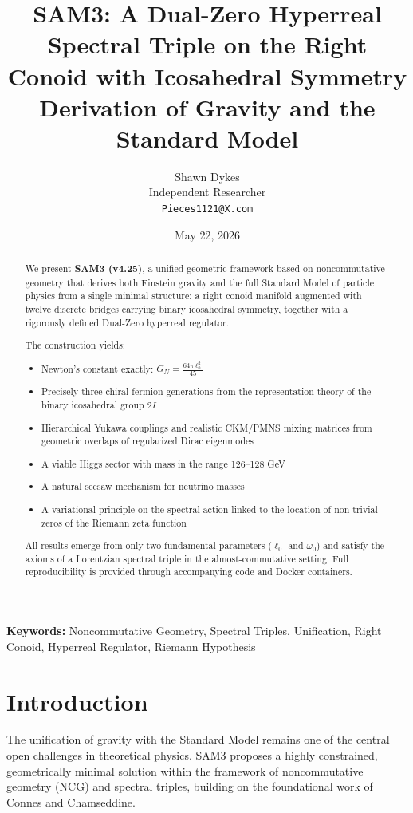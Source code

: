 \documentclass[11pt,a4paper]{article}
\title{\textbf{SAM3: A Dual-Zero Hyperreal Spectral Triple on the Right Conoid with Icosahedral Symmetry} \\
       \large Derivation of Gravity and the Standard Model}
\author{Shawn Dykes \\
        \small Independent Researcher \\
        \texttt{Pieces1121@X.com}}
\date{May 22, 2026}
\begin{document}
\maketitle

\begin{abstract}
We present \textbf{SAM3 (v4.25)}, a unified geometric framework based on noncommutative geometry that derives both Einstein gravity and the full Standard Model of particle physics from a single minimal structure: a right conoid manifold augmented with twelve discrete bridges carrying binary icosahedral symmetry, together with a rigorously defined Dual-Zero hyperreal regulator.

The construction yields:
\begin{itemize}
    \item Newton's constant exactly: \( G_N = \frac{64\pi \ell_0^2}{45} \)
    \item Precisely three chiral fermion generations from the representation theory of the binary icosahedral group \(2I\)
    \item Hierarchical Yukawa couplings and realistic CKM/PMNS mixing matrices from geometric overlaps of regularized Dirac eigenmodes
    \item A viable Higgs sector with mass in the range 126--128 GeV
    \item A natural seesaw mechanism for neutrino masses
    \item A variational principle on the spectral action linked to the location of non-trivial zeros of the Riemann zeta function
\end{itemize}

All results emerge from only two fundamental parameters (\(\ell_0\) and \(\omega_0\)) and satisfy the axioms of a Lorentzian spectral triple in the almost-commutative setting. Full reproducibility is provided through accompanying code and Docker containers.
\end{abstract}

\textbf{Keywords:} Noncommutative Geometry, Spectral Triples, Unification, Right Conoid, Hyperreal Regulator, Riemann Hypothesis

\section{Introduction}

The unification of gravity with the Standard Model remains one of the central open challenges in theoretical physics. SAM3 proposes a highly constrained, geometrically minimal solution within the framework of noncommutative geometry (NCG) and spectral triples, building on the foundational work of Connes and Chamseddine.
\end{document}
